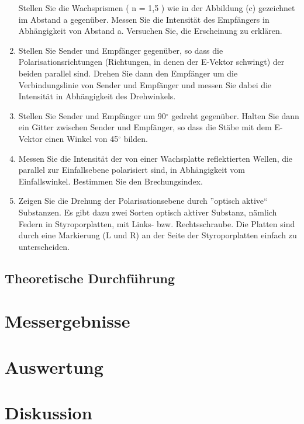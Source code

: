 \documentclass[12pt]{scrartcl}
\begin{document}
\begin{enumerate}
Stellen Sie die Wachsprismen ( n = 1,5 ) wie in der Abbildung (c) gezeichnet im Abstand a gegenüber. Messen Sie die Intensität des Empfängers in Abhängigkeit von Abstand a. Versuchen Sie, die Erscheinung zu erklären.
\item Stellen Sie Sender und Empfänger gegenüber, so dass die Polarisationsrichtungen
(Richtungen, in denen der E-Vektor schwingt) der beiden parallel sind. Drehen Sie dann den Empfänger um die Verbindungslinie von Sender und Empfänger und messen Sie dabei die Intensität in Abhängigkeit des Drehwinkels.
\item Stellen Sie Sender und Empfänger um 90$^{\circ}$ gedreht gegenüber. Halten Sie dann ein Gitter zwischen Sender und Empfänger, so dass die Stäbe mit dem E-Vektor einen Winkel von 45$^{\circ}$ bilden.
\item Messen Sie die Intensität der von einer Wachsplatte reflektierten Wellen, die parallel zur Einfallsebene polarisiert sind, in Abhängigkeit vom Einfallswinkel. Bestimmen Sie den Brechungsindex.
\item Zeigen Sie die Drehung der Polarisationsebene durch ”optisch aktive“ Substanzen. Es gibt dazu zwei Sorten optisch aktiver Substanz, nämlich Federn in Styroporplatten, mit Links- bzw. Rechtsschraube. Die Platten sind durch eine Markierung (L und R) an der Seite der Styroporplatten einfach zu unterscheiden.
\end{enumerate}

\subsection{Theoretische Durchführung}


\section{Messergebnisse}



\section{Auswertung}


\section{Diskussion}


\end{document}

